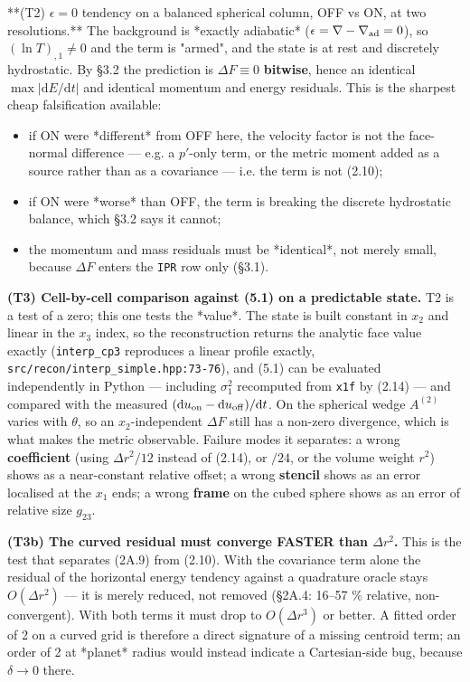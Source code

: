 \documentclass[11pt,a4paper]{article}
\begin{document}
**(T2) $\epsilon=0$ tendency on a balanced spherical column, OFF vs ON, at two
resolutions.** The background is *exactly adiabatic*
($\epsilon=\nabla-\nabla_{\rm ad}=0$), so $(\ln T)_{,1}\neq0$ and the term is
"armed", and the state is at rest and discretely hydrostatic. By §3.2 the
prediction is $\Delta F\equiv0$ \textbf{bitwise}, hence an identical
$\max|\mathrm{d}E/\mathrm{d}t|$ and identical momentum and energy residuals. This
is the sharpest cheap falsification available:

\begin{itemize}
\item if ON were *different* from OFF here, the velocity factor is not the face-normal
  difference — e.g. a $p'$-only term, or the metric moment added as a source
  rather than as a covariance — i.e. the term is not (2.10);
\item if ON were *worse* than OFF, the term is breaking the discrete hydrostatic
  balance, which §3.2 says it cannot;
\item the momentum and mass residuals must be *identical*, not merely small, because
  $\Delta F$ enters the \texttt{IPR} row only (§3.1).
\end{itemize}

\textbf{(T3) Cell-by-cell comparison against (5.1) on a predictable state.} T2 is a
test of a zero; this one tests the *value*. The state is built constant in $x_2$
and linear in the $x_3$ index, so the reconstruction returns the analytic face
value exactly (\texttt{interp\_cp3} reproduces a linear profile exactly,
\texttt{src/recon/interp\_simple.hpp:73-76}), and (5.1) can be evaluated independently in
Python — including $\sigma_1^2$ recomputed from \texttt{x1f} by (2.14) — and compared
with the measured $(\mathrm{d}u_{\rm on}-\mathrm{d}u_{\rm off})/\mathrm{d}t$. On
the spherical wedge $A^{(2)}$ varies with $\theta$, so an $x_2$-independent
$\Delta F$ still has a non-zero divergence, which is what makes the metric
observable. Failure modes it separates: a wrong \textbf{coefficient} (using
$\Delta r^2/12$ instead of (2.14), or $/24$, or the volume weight $r^2$) shows as
a near-constant relative offset; a wrong \textbf{stencil} shows as an error localised
at the $x_1$ ends; a wrong \textbf{frame} on the cubed sphere shows as an error of
relative size $g_{23}$.

\textbf{(T3b) The curved residual must converge FASTER than $\Delta r^2$.} This is the
test that separates (2A.9) from (2.10). With the covariance term alone the
residual of the horizontal energy tendency against a quadrature oracle stays
$O(\Delta r^2)$ — it is merely reduced, not removed (§2A.4: 16–57 \% relative,
non-convergent). With both terms it must drop to $O(\Delta r^3)$ or better. A
fitted order of 2 on a curved grid is therefore a direct signature of a missing
centroid term; an order of 2 at *planet* radius would instead indicate a
Cartesian-side bug, because $\delta\to0$ there.
\end{document}
